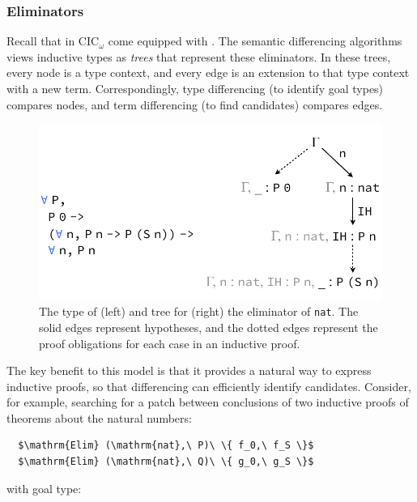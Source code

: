 \subsubsection*{Eliminators} %
Recall that  in CIC$_{\omega}$ come equipped with .
The semantic differencing algorithms views inductive types as \emph{trees} that represent these eliminators.
In these trees, every node is a type context, and every edge is an extension to that type context 
with a new term. %
Correspondingly, type differencing (to identify goal types) compares nodes, 
and term differencing (to find candidates) compares edges. 

\begin{figure}
\begin{center}
\includegraphics[scale=0.55]{repair/nat_ind}
\end{center}
\caption{The type of (left) and tree for (right) the eliminator of \lstinline{nat}. The solid edges represent hypotheses, and the dotted edges represent the proof obligations for each case in an inductive proof.} %
\label{fig:cattree}
\end{figure}

The key benefit to this model is that it provides a natural way to express inductive proofs, so
that differencing can efficiently identify candidates.
Consider, for example, searching for a patch between conclusions of two inductive proofs of theorems about the natural numbers:

\begin{lstlisting}
  $\mathrm{Elim} (\mathrm{nat},\ P)\ \{ f_0,\ f_S \}$
  $\mathrm{Elim} (\mathrm{nat},\ Q)\ \{ g_0,\ g_S \}$ 
\end{lstlisting}
with goal type:

